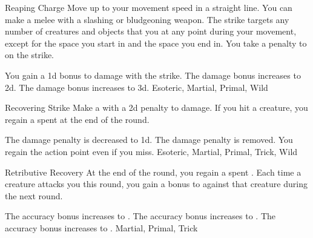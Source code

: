 \lowercase{\hypertarget{maneuver:Reaping Charge}{}}\label{maneuver:Reaping Charge}
\hypertarget{maneuver:Reaping Charge}{}
\begin{apability}{Reaping Charge}
Move up to your movement speed in a straight line.
You can make a melee  with a slashing or bludgeoning weapon.
The strike targets any number of creatures and objects that you  at any point during your movement, except for the space you start in and the space you end in.
You take a  penalty to  on the strike.

\rankline
{} You gain a \plus1d bonus to damage with the strike.
 The damage bonus increases to \plus2d.
 The damage bonus increases to \plus3d.
 Esoteric, Martial, Primal, Wild
\end{apability}
\vspace{0.25em}



\lowercase{\hypertarget{maneuver:Recovering Strike}{}}\label{maneuver:Recovering Strike}
\hypertarget{maneuver:Recovering Strike}{}
\begin{freeability}{Recovering Strike}
Make a  with a \minus2d penalty to damage.
If you hit a creature, you regain a spent  at the end of the round.

\rankline
{} The damage penalty is decreased to \minus1d.
 The damage penalty is removed.
 You regain the action point even if you miss.
 Esoteric, Martial, Primal, Trick, Wild
\end{freeability}
\vspace{0.25em}



\lowercase{\hypertarget{maneuver:Retributive Recovery}{}}\label{maneuver:Retributive Recovery}
\hypertarget{maneuver:Retributive Recovery}{}
\begin{freeability}{Retributive Recovery}
At the end of the round, you regain a spent .
Each time a creature attacks you this round, you gain
a  bonus to  against that creature during the next round.

\rankline
{} The accuracy bonus increases to .
 The accuracy bonus increases to .
 The accuracy bonus increases to .
 Martial, Primal, Trick
\end{freeability}
\vspace{0.25em}



